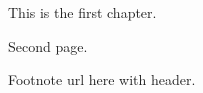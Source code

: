 
This is the first chapter.

\newpage

Second page.

Footnote url here with header.

\KittelEquationExpandedX

\clearpage